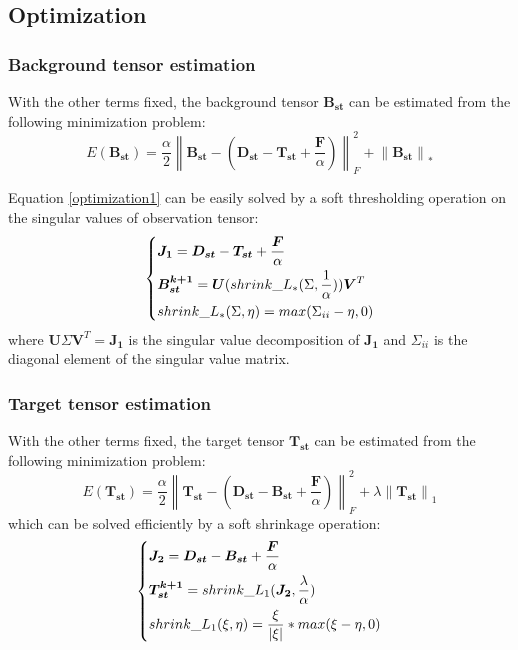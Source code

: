 \documentclass[journal]{IEEEtran}
\begin{document}
\subsection{Optimization}
\subsubsection{Background tensor estimation}
With the other terms fixed, the background tensor $\bm{B_{st}}$ can be estimated from the following minimization problem:
\begin{equation}
  E(\bm{B_{st}})=\frac{\alpha}{2} \left \|\bm{B_{st}}-(\bm{D_{st}}-\bm{T_{st}}+\frac{\bm{F}}{\alpha}) \right \|_F^2 + \left \|\bm{B_{st}} \right \| _*
  \label{optimization1}
\end{equation}

Equation \ref{optimization1} can be easily solved by a soft thresholding operation on the singular values of observation tensor\cite{cai2010singular}:
\begin{equation}
  \begin{dcases}
    \bm{J_1}=\bm{D_{st}}-\bm{T_{st}}+\frac{\bm{F}}{\alpha}\\
    \bm{B_{st}^{k+1}}=\bm{U}(shrink\_L_{*}(\Sigma,\frac{1}{\alpha}))\bm{V}^{T}\\
    shrink\_L_{*}(\Sigma,\eta)=max(\Sigma_{ii}-\eta,0)
  \end{dcases}
\end{equation}
where $\bm{U}\Sigma\bm{V}^{T}=\bm{J_1}$ is the singular value decomposition of $\bm{J_1}$ and $\Sigma_{ii}$ is the diagonal element of the singular value matrix.

\subsubsection{Target tensor estimation}
With the other terms fixed, the target tensor $\bm{T_{st}}$ can be estimated from the following minimization problem:
\begin{equation}
  E(\bm{T_{st}})=\frac{\alpha}{2} \left \|\bm{T_{st}}-(\bm{D_{st}}-\bm{B_{st}}+\frac{\bm{F}}{\alpha}) \right \|_F^2 + \lambda \left \|\bm{T_{st}} \right \| _1
  \label{optimization2}
\end{equation}
which can be solved efficiently by a soft shrinkage operation:
\begin{equation}
  \begin{dcases}
    \bm{J_2}=\bm{D_{st}}-\bm{B_{st}}+\frac{\bm{F}}{\alpha}\\
    \bm{T_{st}^{k+1}}=shrink\_L_{1}(\bm{J_2},\frac{\lambda}{\alpha})\\
    shrink\_L_{1}(\xi,\eta)=\frac{\xi}{|\xi|} \ast max(\xi-\eta,0)
  \end{dcases}
\end{equation}
\end{document}
